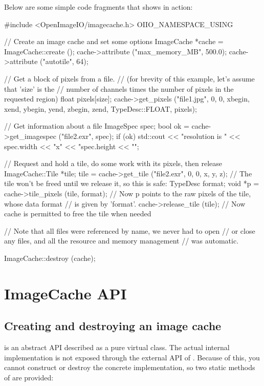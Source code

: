 \newpage
Below are some simple code fragments that shows \ImageCache in action:
\medskip

\begin{code}
    #include <OpenImageIO/imagecache.h>
    OIIO_NAMESPACE_USING

    // Create an image cache and set some options
    ImageCache *cache = ImageCache::create ();
    cache->attribute ("max_memory_MB", 500.0);
    cache->attribute ("autotile", 64);

    // Get a block of pixels from a file.
    // (for brevity of this example, let's assume that 'size' is the
    // number of channels times the number of pixels in the requested region)
    float pixels[size];
    cache->get_pixels ("file1.jpg", 0, 0, xbegin, xend, ybegin, yend,
                       zbegin, zend, TypeDesc::FLOAT, pixels);

    // Get information about a file
    ImageSpec spec;
    bool ok = cache->get_imagespec ("file2.exr", spec);
    if (ok)
        std::cout << "resolution is " << spec.width << "x" 
                  << "spec.height << "\n";

    // Request and hold a tile, do some work with its pixels, then release
    ImageCache::Tile *tile;
    tile = cache->get_tile ("file2.exr", 0, 0, x, y, z);
    // The tile won't be freed until we release it, so this is safe:
    TypeDesc format;
    void *p = cache->tile_pixels (tile, format);
    // Now p points to the raw pixels of the tile, whose data format
    // is given by 'format'.
    cache->release_tile (tile);  
    // Now cache is permitted to free the tile when needed

    // Note that all files were referenced by name, we never had to open
    // or close any files, and all the resource and memory management 
    // was automatic.

    ImageCache::destroy (cache);
\end{code}

\newpage
\section{ImageCache API}
\label{sec:imagecache:api}

\subsection{Creating and destroying an image cache}
\label{sec:imagecache:api:createdestroy}

\ImageCache is an abstract API described as a pure virtual class.  The
actual internal implementation is not exposed through the external API
of \product.  Because of this, you cannot construct or destroy the
concrete implementation, so two static methods of \ImageCache are
provided:

